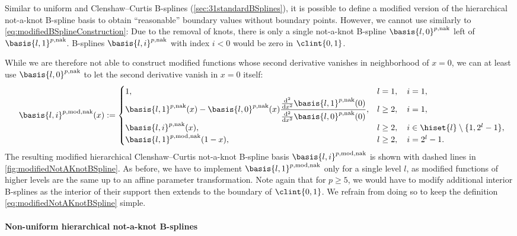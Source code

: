 Similar to uniform and Clenshaw--Curtis B-splines
(\cref{sec:31standardBSplines}),
it is possible to define a modified version of the
hierarchical not-a-knot B-spline basis to obtain
``reasonable'' boundary values without boundary points.
However, we cannot use  similarly to
\eqref{eq:modifiedBSplineConstruction}:
Due to the removal of knots, there is only a single
not-a-knot B-spline $\basis{l,0}^{p,\notaknot}$ left of
$\basis{l,1}^{p,\notaknot}$.
B-splines $\basis{l,i}^{p,\notaknot}$ with index $i < 0$
would be zero in $\clint{0, 1}$.

While we are therefore not able to construct modified functions
whose second derivative vanishes in neighborhood of $x = 0$,
we can at least use $\basis{l,0}^{p,\notaknot}$ to let the
second derivative vanish in $x = 0$ itself:
\begin{equation}
  \label{eq:modifiedNotAKnotBSpline}
  \basis{l,i}^{p,\modified,\notaknot}(x)
  :=
  \begin{cases}
    1,&
    l = 1,\quad i = 1,\\
    \basis{l,1}^{p,\notaknot}(x)
    - \basis{l,0}^{p,\notaknot}(x)
    \dfrac{\frac{\diff^2}{\dx^2} \basis{l,1}^{p,\notaknot}(0)}%
    {\frac{\diff^2}{\dx^2} \basis{l,0}^{p,\notaknot}(0)},&
    l \ge 2,\quad i = 1,\\
    \basis{l,i}^{p,\notaknot}(x),&
    l \ge 2,\quad i \in \hiset{l} \setminus \{1, 2^l - 1\},\\
    \basis{l,1}^{p,\modified,\notaknot}(1 - x),&
    l \ge 2,\quad i = 2^l - 1.
  \end{cases}
  \hspace*{-2mm}
\end{equation}
The resulting modified hierarchical Clenshaw--Curtis not-a-knot B-spline basis
$\basis{l,i}^{p,\modified,\notaknot}$ is shown with dashed lines
in \cref{fig:modifiedNotAKnotBSpline}.
As before, we have to implement $\basis{l,1}^{p,\modified,\notaknot}$
only for a single level $l$, as modified functions of higher levels
are the same up to an affine parameter transformation.
Note again that for $p \ge 5$, we would have to modify additional
interior B-splines as the interior of their support then extends to the
boundary of $\clint{0, 1}$.
We refrain from doing so to keep the definition
\eqref{eq:modifiedNotAKnotBSpline} simple.

\paragraph{Non-uniform hierarchical not-a-knot B-splines}

